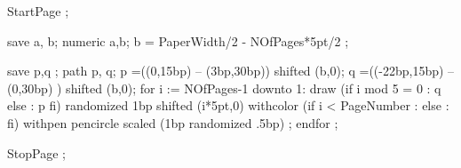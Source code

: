 StartPage ;

save a, b; 
numeric a,b;
b = PaperWidth/2 - NOfPages*5pt/2 ;

save p,q ; path p, q;
p =((0,15bp)    -- (3bp,30bp)) shifted (b,0);
q =((-22bp,15bp) -- (0,30bp) ) shifted (b,0);
 for i := NOfPages-1 downto 1:
   draw (if i mod 5 = 0 : q else : p fi) 
         randomized 1bp
         shifted (i*5pt,0)
        withcolor (if i < PageNumber :  
                  else :              
                  fi) 
      withpen pencircle scaled (1bp randomized .5bp) ;
 endfor ;

% 
% 

% 
% 
% 

StopPage ;
\stopuseMPgraphic

